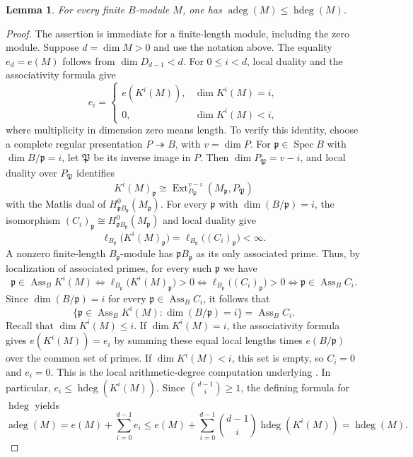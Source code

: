 \documentclass[11pt,reqno]{amsart}
\numberwithin{equation}{section}
\newtheorem{lemma}[theorem]{Lemma}
\theoremstyle{definition}
\newcommand{\hdeg}{\operatorname{hdeg}}
\newcommand{\adeg}{\operatorname{adeg}}
\newcommand{\Ass}{\operatorname{Ass}}
\newcommand{\Ext}{\operatorname{Ext}}
\begin{document}
\begin{lemma}\label{lem:arithmetic-homological-degree}
For every finite $B$-module $M$, one has
$\adeg(M)\le\hdeg(M)$.
\end{lemma}
\begin{proof}
The assertion is immediate for a finite-length module, including
the zero module. Suppose $d=\dim M>0$ and use the notation above.
The equality $e_d=e(M)$ follows from $\dim D_{d-1}<d$.
For $0\le i<d$, local duality and the associativity formula give
\[
 e_i=
 \begin{cases}
 e(K^i(M)),&\dim K^i(M)=i,\\
 0,&\dim K^i(M)<i,
 \end{cases}
\]
where multiplicity in dimension zero means length.
To verify this identity, choose a complete regular presentation
$P\twoheadrightarrow B$, with $v=\dim P$.
For $\mathfrak p\in\operatorname{Spec}B$ with
$\dim B/\mathfrak p=i$, let $\mathfrak P$ be its inverse image
in $P$. Then $\dim P_{\mathfrak P}=v-i$, and local duality over
$P_{\mathfrak P}$ identifies
\[
 K^i(M)_{\mathfrak p}
 \cong\Ext^{v-i}_{P_{\mathfrak P}}
             (M_{\mathfrak p},P_{\mathfrak P})
\]
with the Matlis dual of
$H^0_{\mathfrak pB_{\mathfrak p}}(M_{\mathfrak p})$.
For every $\mathfrak p$ with $\dim(B/\mathfrak p)=i$, the
isomorphism $(C_i)_{\mathfrak p}\cong
H^0_{\mathfrak pB_{\mathfrak p}}(M_{\mathfrak p})$ and local duality give
\[
 \ell_{B_{\mathfrak p}}\bigl(K^i(M)_{\mathfrak p}\bigr)
 =\ell_{B_{\mathfrak p}}\bigl((C_i)_{\mathfrak p}\bigr)<\infty.
\]
A nonzero finite-length $B_{\mathfrak p}$-module has
$\mathfrak pB_{\mathfrak p}$ as its only associated prime.
Thus, by localization of associated primes, for every such
$\mathfrak p$ we have
\[
 \mathfrak p\in\Ass_B K^i(M)
 \Longleftrightarrow
 \ell_{B_{\mathfrak p}}\bigl(K^i(M)_{\mathfrak p}\bigr)>0
 \Longleftrightarrow
 \ell_{B_{\mathfrak p}}\bigl((C_i)_{\mathfrak p}\bigr)>0
 \Longleftrightarrow\mathfrak p\in\Ass_B C_i.
\]
Since $\dim(B/\mathfrak p)=i$ for every
$\mathfrak p\in\Ass_B C_i$, it follows that
\[
 \{\mathfrak p\in\Ass_B K^i(M):\dim(B/\mathfrak p)=i\}
 =\Ass_B C_i.
\]
Recall that $\dim K^i(M)\le i$.
If $\dim K^i(M)=i$, the associativity formula gives
$e(K^i(M))=e_i$ by summing these equal local lengths times
$e(B/\mathfrak p)$ over the common set of primes. If
$\dim K^i(M)<i$, this set is empty, so $C_i=0$ and $e_i=0$.
This is the local arithmetic-degree computation underlying
\cite[Proposition~5]{Vasconcelos1996}.
In particular, $e_i\le\hdeg(K^i(M))$. Since
$\binom{d-1}{i}\ge1$, the defining formula for $\hdeg$ yields
\[
 \adeg(M)=e(M)+\sum_{i=0}^{d-1}e_i
 \le e(M)+\sum_{i=0}^{d-1}\binom{d-1}{i}\hdeg(K^i(M))
 =\hdeg(M).
\]
\end{proof}
\end{document}
